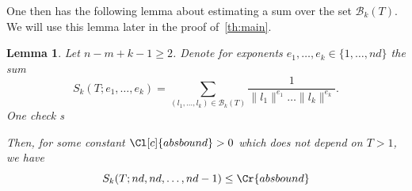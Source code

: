 \documentclass{amsart}
\newtheorem{lemma}[theorem]{Lemma}
\theoremstyle{definition}
\theoremstyle{remark}
\begin{document}
One then has the following lemma about estimating a 
sum over the
set $\mathcal{B}_{k}(T)$. We will use this lemma later in the proof of~\cref{th:main}.
\begin{lemma}
    \label{le:induction_on_sums}
    Let $n-m+k-1 \geq 2$.
    Denote for exponents $e_{1},\dots,e_{k} \in \{1,\dots,nd\}$ the sum
    \begin{equation}
        S_{k}(T; {e_{1},\dots,e_{k}}) = 
        \sum_{(l_{1},\dots,l_{k}) \in \mathcal{B}_{k}(T)}^{} \frac{1}{\|l_{1}\|^{e_{1}} \dots \|l_{k}\|^{e_{k}}}.
    \end{equation}
    One check s 

    Then, for some constant $\Cl[c]{absbound}>0$ which does not depend on $T>1$, we have 
    \begin{equation}
        S_{k}(T;{nd,nd,\dots,nd-1}) \leq \Cr{absbound} 
    \end{equation}
\end{lemma}
\end{document}
